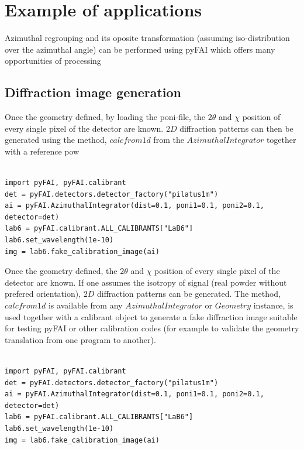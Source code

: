 \documentclass[preprint]{iucr}
\begin{document}
\section{Example of applications}

Azimuthal regrouping and its oposite transformation (assuming
iso-distribution over the azimuthal angle) can be performed
using pyFAI which offers many opportunities of processing

\subsection{Diffraction image generation}


Once the geometry defined, by loading the poni-file, the $2\theta$ and $\chi$
position of every single pixel of the detector are known.
$2D$ diffraction patterns can then be generated using the method, $calcfrom1d$
from the $Azimuthal Integrator$ together with a reference pow

\begin{verbatim}

import pyFAI, pyFAI.calibrant
det = pyFAI.detectors.detector_factory("pilatus1m")
ai = pyFAI.AzimuthalIntegrator(dist=0.1, poni1=0.1, poni2=0.1, detector=det)
lab6 = pyFAI.calibrant.ALL_CALIBRANTS["LaB6"]
lab6.set_wavelength(1e-10)
img = lab6.fake_calibration_image(ai)
\end{verbatim}



Once the geometry defined, the $2\theta$ and $\chi$ position of every single
pixel of the detector are known.
If one assumes the isotropy of signal (real powder without prefered
orientation), $2D$ diffraction patterns can be generated.
The method, $calcfrom1d$ is available from any $Azimuthal Integrator$ or
$Geometry$ instance, is used together with a calibrant object
to generate a fake diffraction image suitable for testing pyFAI or other 
calibration codes (for example to validate the geometry translation from one
program to another).

\begin{verbatim}

import pyFAI, pyFAI.calibrant
det = pyFAI.detectors.detector_factory("pilatus1m")
ai = pyFAI.AzimuthalIntegrator(dist=0.1, poni1=0.1, poni2=0.1, detector=det)
lab6 = pyFAI.calibrant.ALL_CALIBRANTS["LaB6"]
lab6.set_wavelength(1e-10)
img = lab6.fake_calibration_image(ai)
\end{verbatim}
\end{document}
